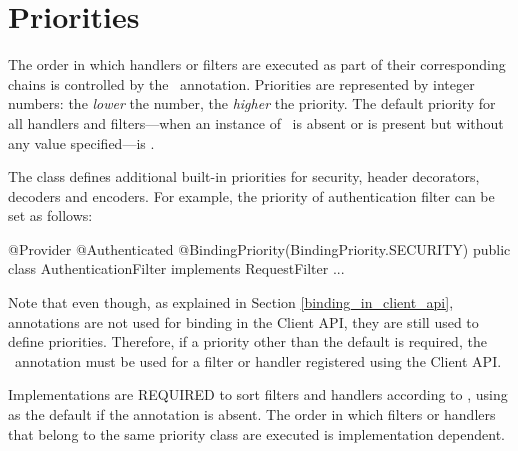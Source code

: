 \section{Priorities}
\label{priorities}

The order in which handlers or filters are executed as part of their corresponding chains is controlled by the \BindingPriority\ annotation.
Priorities are represented by integer numbers: the \emph{lower} the number, the \emph{higher} the priority. The default priority for all handlers and filters---when an instance of \BindingPriority\ is absent or is present but without any value specified---is . 

The  class defines additional built-in priorities for security, header decorators, decoders and encoders. For example, the priority of authentication filter can be set as follows:

\begin{listing}{1}
@Provider
@Authenticated
@BindingPriority(BindingPriority.SECURITY)
public class AuthenticationFilter implements RequestFilter {
    ...
}
\end{listing}

Note that even though, as explained in Section \ref{binding_in_client_api}, annotations are not used for binding in the Client API, they are still used to define priorities. Therefore, if a priority other than the default is required, the \BindingPriority\ annotation must be used for a filter or handler registered using the Client API. 

Implementations are REQUIRED to sort filters and handlers according to , using  as the default if the annotation is absent. The order in which filters or handlers that belong to the same priority class are executed is implementation dependent.



